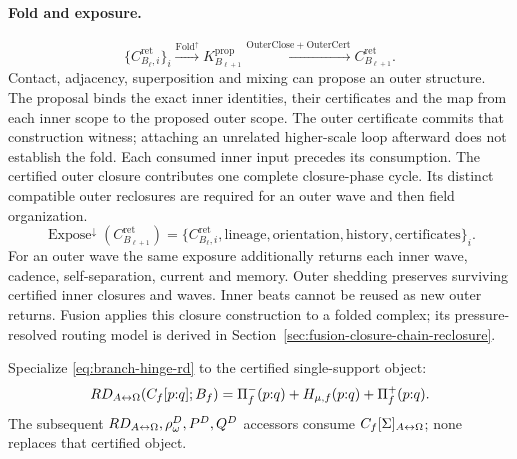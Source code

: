 \paragraph{Fold and exposure.}
\begin{equation}
\{C^{\mathrm{ret}}_{B_\ell,i}\}_i
\xrightarrow{\operatorname{Fold}^{\uparrow}}K^{\mathrm{prop}}_{B_{\ell+1}}
\xrightarrow{\mathrm{OuterClose}+\mathrm{OuterCert}}C^{\mathrm{ret}}_{B_{\ell+1}}.
\label{eq:fold-outer-closure}
\end{equation}
Contact, adjacency, superposition and mixing can propose an outer structure.
The proposal binds the exact inner identities, their certificates and the map
from each inner scope to the proposed outer scope. The outer certificate commits
that construction witness; attaching an unrelated higher-scale loop afterward
does not establish the fold. Each consumed inner input precedes its consumption.
The certified outer closure contributes one complete closure-phase cycle. Its distinct compatible
outer reclosures are required for an outer wave and then field organization.
\begin{equation}
\operatorname{Expose}^{\downarrow}(C^{\mathrm{ret}}_{B_{\ell+1}})
=\{C^{\mathrm{ret}}_{B_\ell,i},\mathrm{lineage},\mathrm{orientation},
\mathrm{history},\mathrm{certificates}\}_i.
\label{eq:expose-inner-lineage}
\end{equation}
For an outer wave the same exposure additionally returns each inner wave,
cadence, self-separation, current and memory. Outer shedding preserves
surviving certified inner closures and waves. Inner beats cannot be reused as
new outer returns. Fusion applies this closure construction to a folded
complex; its pressure-resolved routing model is derived in Section~\ref{sec:fusion-closure-chain-reclosure}.

Specialize \eqref{eq:branch-hinge-rd} to the certified single-support object:
\begin{equation}
RD_{A{\leftrightarrow}\Omega}\!\left(C_f[p{:}q];B_f\right)
=
\Pi^-_f(p{:}q)+H_{\mu,f}(p{:}q)+\Pi^+_f(p{:}q).
\label{eq:cycle-rd-accessor}
\end{equation}
The subsequent \(RD_{A{\leftrightarrow}\Omega},\rho^D_\omega,P^D,Q^D\) accessors consume
\(C_f[\Sigma]_{A{\leftrightarrow}\Omega}\); none replaces that certified object.

